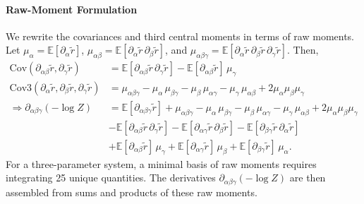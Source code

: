 \documentclass{article}
\begin{document}
\paragraph{Raw-Moment Formulation}

We rewrite the covariances and third central moments in terms of raw moments.
Let $\mu_{\alpha} = \mathbb{E}[\partial_{\alpha} \tilde{r}]$, $\mu_{\alpha\beta} = \mathbb{E}[\partial_{\alpha} \tilde{r} \, \partial_{\beta} \tilde{r}]$, and $\mu_{\alpha\beta\gamma} = \mathbb{E}[\partial_{\alpha} \tilde{r} \, \partial_{\beta} \tilde{r} \, \partial_{\gamma} \tilde{r}]$.
Then,
%
\begin{align}
  \mathrm{Cov}(\partial_{\alpha\beta} \tilde{r}, \partial_{\gamma} \tilde{r})                         & = \mathbb{E}[\partial_{\alpha\beta} \tilde{r} \, \partial_{\gamma} \tilde{r}] - \mathbb{E}[\partial_{\alpha\beta} \tilde{r}] \, \mu_{\gamma}                                                                                                                                        \\
  \mathrm{Cov3}(\partial_{\alpha} \tilde{r}, \partial_{\beta} \tilde{r}, \partial_{\gamma} \tilde{r}) & = \mu_{\alpha\beta\gamma} - \mu_{\alpha} \, \mu_{\beta\gamma} - \mu_{\beta} \, \mu_{\alpha\gamma} - \mu_{\gamma} \, \mu_{\alpha\beta} + 2 \mu_{\alpha} \mu_{\beta} \mu_{\gamma}                                                                                                     \\
  \Rightarrow \partial_{\alpha\beta\gamma} (-\log Z)                                                  & = \mathbb{E}[\partial_{\alpha\beta\gamma} \tilde{r}] + \mu_{\alpha\beta\gamma} - \mu_{\alpha} \, \mu_{\beta\gamma} - \mu_{\beta} \, \mu_{\alpha\gamma} - \mu_{\gamma} \, \mu_{\alpha\beta} + 2 \mu_{\alpha} \mu_{\beta} \mu_{\gamma} \label{eq:neglogz-third-derivative-raw-moment} \\
                                                                                                      & - \mathbb{E}[\partial_{\alpha\beta} \tilde{r} \, \partial_{\gamma} \tilde{r}] - \mathbb{E}[\partial_{\alpha\gamma} \tilde{r} \, \partial_{\beta} \tilde{r}] - \mathbb{E}[\partial_{\beta\gamma} \tilde{r} \, \partial_{\alpha} \tilde{r}] \nonumber                                 \\
                                                                                                      & + \mathbb{E}[\partial_{\alpha\beta} \tilde{r}] \, \mu_{\gamma} + \mathbb{E}[\partial_{\alpha\gamma} \tilde{r}] \, \mu_{\beta} + \mathbb{E}[\partial_{\beta\gamma} \tilde{r}] \, \mu_{\alpha}. \nonumber
\end{align}
%
For a three-parameter system, a minimal basis of raw moments requires integrating 25 unique quantities.
The derivatives $\partial_{\alpha\beta\gamma} (-\log Z)$ are then assembled from sums and products of these raw moments.
\end{document}
